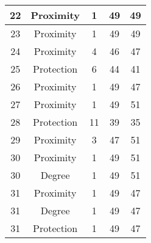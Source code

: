 \documentclass[results.tex]{subfiles}
\begin{document}
\begin{center}
\begin{tabular}{| c || c | c | c | c |}
            \hline
            22                      & Proximity                    & 1                      & 49                      & 49                   \\
            \hline
            23                      & Proximity                    & 1                      & 49                      & 49                   \\
            \hline
            24                      & Proximity                    & 4                      & 46                      & 47                   \\
            \hline
            25                      & Protection                   & 6                      & 44                      & 41                   \\
            \hline
            26                      & Proximity                    & 1                      & 49                      & 47                   \\
            \hline
            27                      & Proximity                    & 1                      & 49                      & 51                   \\
            \hline
            28                      & Protection                   & 11                     & 39                      & 35                   \\
            \hline
            29                      & Proximity                    & 3                      & 47                      & 51                   \\
            \hline
            30                      & Proximity                    & 1                      & 49                      & 51                   \\
            \hline
            30                      & Degree                       & 1                      & 49                      & 51                   \\
            \hline
            31                      & Proximity                    & 1                      & 49                      & 47                   \\
            \hline
            31                      & Degree                       & 1                      & 49                      & 47                   \\
            \hline
            31                      & Protection                   & 1                      & 49                      & 47                   \\

\end{tabular}
\end{center}
\end{document}
